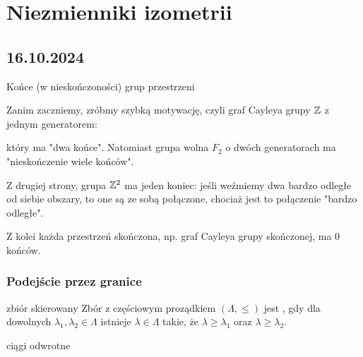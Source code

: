 \chapter{Niezmienniki izometrii}

\section{16.10.2024}{Końce (w nieskończoności) grup przestrzeni}

Zanim zaczniemy, zróbmy szybką motywację, czyli graf Cayleya grupy $\mathbb{Z}$ z jednym generatorem:
\begin{center}
\end{center}
który ma "dwa końce". Natomiast grupa wolna $F_2$ o dwóch generatorach ma "nieskończenie wiele końców". 
\begin{center}
\end{center}
Z drugiej strony, grupa $\mathbb{Z}^2$ ma jeden koniec: jeśli weźmiemy dwa bardzo odległe od siebie obszary, to one są ze sobą połączone, chociaż jest to połączenie "bardzo odległe".
\begin{center}
\end{center}
Z kolei każda przestrzeń skończona, np. graf Cayleya grupy skończonej, ma $0$ końców.

\subsection{Podejście przez granice}

\begin{definition}{zbiór skierowany}{}
  Zbór z częściowym proządkiem $(\Lambda, \leq)$ jest , gdy dla dowolnych $\lambda_1,\lambda_2\in\Lambda$ istnieje $\lambda\in\Lambda$ takie, że $\lambda\geq \lambda_1$ oraz $\lambda\geq \lambda_2$.
\end{definition}

{\large\color{red}ciągi odwrotne}


